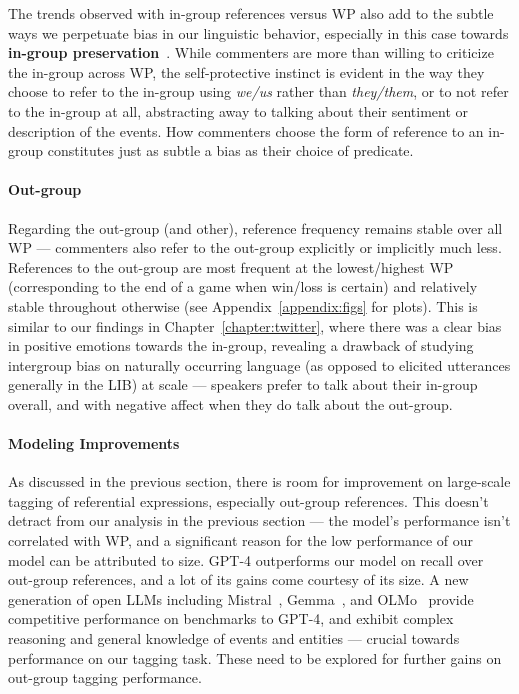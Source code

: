 The trends observed with in-group references versus WP also add to the subtle ways we perpetuate bias in our linguistic behavior, especially in this case towards \textbf{in-group preservation}~\citep{maass_linguistic_1999}. While commenters are more than willing to criticize the in-group across WP, the self-protective instinct is evident in the way they choose to refer to the in-group using \emph{we/us} rather than \emph{they/them}, or to not refer to the in-group at all, abstracting away to talking about their sentiment or description of the events. How commenters choose the form of reference to an in-group constitutes just as subtle a bias as their choice of predicate.

\paragraph{Out-group} Regarding the out-group (and other), reference frequency remains stable over all WP --- commenters also refer to the out-group explicitly or implicitly much less. References to the out-group are most frequent at the lowest/highest WP (corresponding to the end of a game when win/loss is certain) and relatively stable throughout otherwise (see Appendix~\ref{appendix:figs} for plots). This is similar to our findings in Chapter~\ref{chapter:twitter}, where there was a clear bias in positive emotions towards the in-group, revealing a drawback of studying intergroup bias on naturally occurring language (as opposed to elicited utterances generally in the LIB) at scale --- speakers prefer to talk about their in-group overall, and with negative affect when they do talk about the out-group.


\paragraph{Modeling Improvements} As discussed in the previous section, there is room for improvement on large-scale tagging of referential expressions, especially out-group references. This doesn't detract from our analysis in the previous section --- the model's performance isn't correlated with WP, and a significant reason for the low performance of our model can be attributed to size. GPT-4 outperforms our model on recall over out-group references, and a lot of its gains come courtesy of its size. A new generation of open LLMs including Mistral~\citep{jiang2023mistral}, Gemma~\cite{geminiteam2023gemini}, and OLMo~\citep{Groeneveld2023OLMo} provide competitive performance on benchmarks to GPT-4, and exhibit complex reasoning and general knowledge of events and entities --- crucial towards performance on our tagging task. These need to be explored for further gains on out-group tagging performance.
